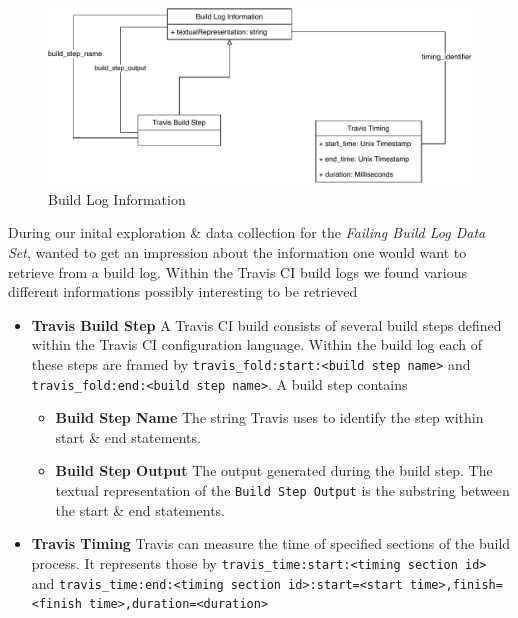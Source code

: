 \documentclass[\myrootdir/main.tex]{subfiles}
\begin{document}
\begin{figure}[h]
	\centering
	\includegraphics[width=\textwidth]{img/mt-graphics-BuildLogInformation.pdf}
	\caption{Build Log Information}
	\label{fig:build-log-information}
\end{figure}
During our inital exploration \& data collection for the \emph{Failing Build Log Data Set}, wanted to get an impression about the information one would want to retrieve from a build log. Within the Travis CI build logs we found various different informations possibly interesting to be retrieved
\begin{itemize}
	\item \textbf{Travis Build Step} A Travis CI build consists of several build steps defined within the Travis CI configuration language. Within the build log each of these steps are framed by \lstinline{travis_fold:start:<build step name>} and \lstinline{travis_fold:end:<build step name>}.
	      A build step contains
	      \begin{itemize}
		      \item \textbf{Build Step Name} The string Travis uses to identify the step within start \& end statements.
		      \item \textbf{Build Step Output} The output generated during the build step. The textual representation of the \texttt{Build Step Output} is the substring between the start \& end statements.
	      \end{itemize}
	\item \textbf{Travis Timing} Travis can measure the time of specified sections of the build process. It represents those by \lstinline{travis_time:start:<timing section id>} and \lstinline{travis_time:end:<timing section id>:start=<start time>,finish=<finish time>,duration=<duration>}
\end{itemize}

\end{document}
